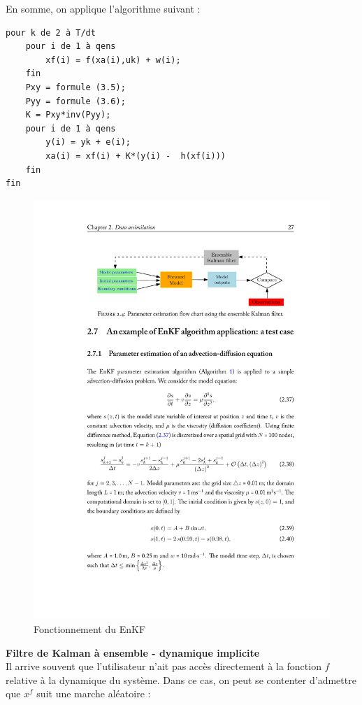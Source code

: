 \documentclass[a4paper]{article}
\newcounter{c}
\newcounter{d}
\newcounter{r}
\newcounter{e}
\newcommand{\chapitre}[1]{\stepcounter{c}\setcounter{e}{0}\setcounter{d}{0}\setcounter{r}{0}\noindent\textbf{\Large#1}\\}
\begin{document}
En somme, on applique l'algorithme suivant :

\begin{verbatim}
pour k de 2 à T/dt
    pour i de 1 à qens
        xf(i) = f(xa(i),uk) + w(i);
    fin
    Pxy = formule (3.5);
    Pyy = formule (3.6);
    K = Pxy*inv(Pyy);
    pour i de 1 à qens
        y(i) = yk + e(i);
        xa(i) = xf(i) + K*(y(i) -  h(xf(i)))
    fin
fin
\end{verbatim}


\begin{figure}
\includegraphics[width=\textwidth,trim = 3.85cm 18.1cm 1.8cm 3.5cm, clip]{enkfchart.pdf}
\caption{Fonctionnement du EnKF}
\end{figure}

\chapitre{Filtre de Kalman à ensemble - dynamique implicite}

Il arrive souvent que l'utilisateur n'ait pas accès directement à la fonction $f$ relative à la dynamique du système. Dans ce cas, on peut se contenter d'admettre que $x^f$ suit une marche aléatoire :
\end{document}
